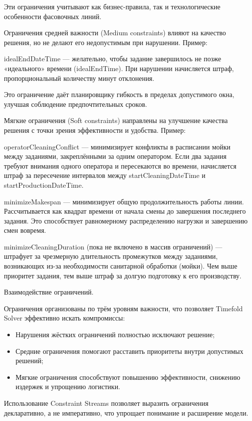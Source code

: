 Эти ограничения учитывают как бизнес-правила, так и технологические особенности фасовочных линий.

Ограничения средней важности (Medium constraints) влияют на качество решения, но не делают его недопустимым при нарушении. Пример:

idealEndDateTime — желательно, чтобы задание завершилось не позже «идеального» времени (idealEndTime). При нарушении начисляется штраф, пропорциональный количеству минут отклонения.

Это ограничение даёт планировщику гибкость в пределах допустимого окна, улучшая соблюдение предпочтительных сроков.

 Мягкие ограничения (Soft constraints) направлены на улучшение качества решения с точки зрения эффективности и удобства. Пример:

 operatorCleaningConflict — минимизирует конфликты в расписании мойки между заданиями, закреплёнными за одним оператором. Если два задания требуют внимания одного оператора и пересекаются во времени, начисляется штраф за пересечение интервалов между startCleaningDateTime и startProductionDateTime.

 minimizeMakespan — минимизирует общую продолжительность работы линии. Рассчитывается как квадрат времени от начала смены до завершения последнего задания. Это способствует равномерному распределению нагрузки и завершению смен вовремя.

 minimizeCleaningDuration (пока не включено в массив ограничений) — штрафует за чрезмерную длительность промежутков между заданиями, возникающих из-за необходимости санитарной обработки (мойки). Чем выше приоритет задания, тем выше штраф за долгую подготовку к его производству.

 Взаимодействие ограничений.

Ограничения организованы по трём уровням важности, что позволяет Timefold Solver эффективно искать компромиссы:

\begin{itemize}
    \item Нарушения жёстких ограничений полностью исключают решение;
    \item Средние ограничения помогают расставить приоритеты внутри допустимых решений;
    \item Мягкие ограничения способствуют повышению эффективности, снижению издержек и упрощению логистики.
\end{itemize}

Использование Constraint Streams позволяет выразить ограничения декларативно, а не императивно, что упрощает понимание и расширение модели.
